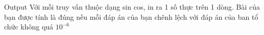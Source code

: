 Output
Với mỗi truy vấn thuộc dạng sin cos, in ra 1 số thực trên 1 dòng. Bài của bạn được tính là đúng nếu mỗi đáp án của bạn chênh lệch với đáp án của ban tổ chức không quá $10^{-6}$